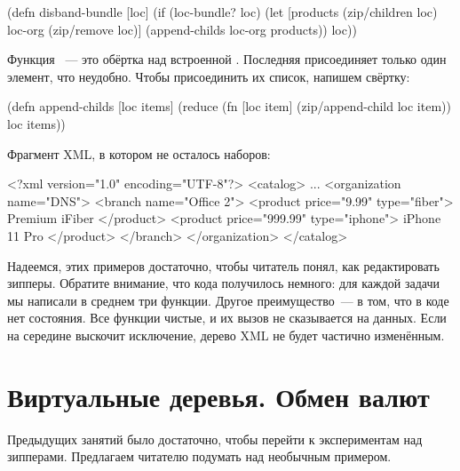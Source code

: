 \begin{english}
  \begin{clojure}
(defn disband-bundle [loc]
  (if (loc-bundle? loc)
    (let [products (zip/children loc)
          loc-org (zip/remove loc)]
      (append-childs loc-org products))
    loc))
  \end{clojure}
\end{english}

Функция ~--- это обёртка над встроенной
. Последняя присоединяет только один элемент, что
неудобно. Чтобы присоединить их список, напишем свёртку:

\begin{english}
  \begin{clojure}
(defn append-childs [loc items]
  (reduce
    (fn [loc item]
      (zip/append-child loc item))
    loc
    items))
  \end{clojure}
\end{english}

Фрагмент XML, в котором не осталось наборов:

\begin{english}
  \begin{xml}
<?xml version="1.0" encoding="UTF-8"?>
<catalog>
  ...
  <organization name="DNS">
    <branch name="Office 2">
      <product price="9.99" type="fiber">
        Premium iFiber
      </product>
      <product price="999.99" type="iphone">
        iPhone 11 Pro
      </product>
    </branch>
  </organization>
</catalog>
  \end{xml}
\end{english}

Надеемся, этих примеров достаточно, чтобы читатель понял, как редактировать
зипперы. Обратите внимание, что кода получилось немного: для каждой задачи мы
написали в среднем три функции. Другое преимущество~--- в том, что в коде нет
состояния. Все функции чистые, и их вызов не сказывается на данных. Если на
середине выскочит исключение, дерево XML не будет частично изменённым.

\section{Виртуальные деревья. Обмен валют}


Предыдущих занятий было достаточно, чтобы перейти к экспериментам над
зипперами. Предлагаем читателю подумать над необычным примером.

